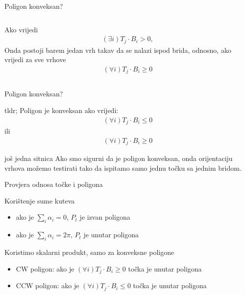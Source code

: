 \documentclass[9pt]{beamer}
\begin{document}
\begin{frame}{Poligon konveksan?}
\begin{columns}
\begin{column}[t]{0.5\textwidth}
\begin{figure}
		\end{figure}
		Ako vrijedi 
	\begin{align*}
	(\exists i) T_j \cdot B_i > 0 ,
	\end{align*}
	Onda postoji barem jedan vrh takav da se nalazi ispod brida, odnosno, ako vrijedi za sve vrhove
		\begin{align*}
		(\forall i) T_j \cdot B_i \geq 0 
		\end{align*}
	\end{column}
\end{columns}	
\end{frame}
\begin{frame}{Poligon konveksan?}
	\begin{block}{tldr;}
		Poligon je konveksan ako vrijedi:
		\begin{align*}
		(\forall i) T_j \cdot B_i \leq 0
		\end{align*}
		ili
		\begin{align*}
		(\forall i) T_j \cdot B_i \geq 0 
		\end{align*}
	\end{block}
	\begin{block}{još jedna sitnica}
		Ako smo sigurni da je poligon konveksan, onda orijentaciju vrhova možemo testirati tako da ispitamo samo jednu točku sa jednim bridom.
	\end{block}
\end{frame}
\begin{frame}{Provjera odnosa točke i poligona}
	\begin{block}{Korištenje sume kuteva}
		\begin{itemize}
			\item ako je $\sum_{i} \alpha_{i} = 0$, $P_{t}$ je izvan poligona
			\item ako je $\sum_{i} \alpha_{i} = 2\pi$, $P_{t}$ je unutar poligona 
		\end{itemize}
	\end{block}

\begin{block}{Koristimo skalarni produkt, samo za konveksne poligone}
	\begin{itemize}
		\item CW poligon: ako je $(\forall i) T_j \cdot B_i \geq 0$ točka je unutar poligona
	  \item CCW poligon: ako je $(\forall i) T_j \cdot B_i \leq 0$ točka je unutar poligona 
	\end{itemize}
\end{block}
\end{frame}
\end{document}
